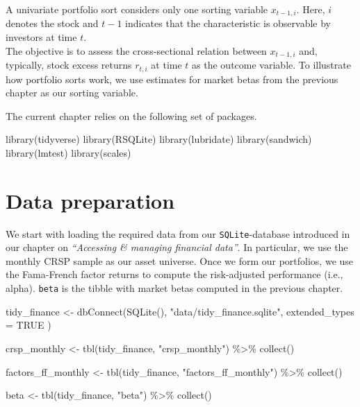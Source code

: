 \documentclass[
]{krantz}
\newenvironment{Shaded}{\begin{snugshade}}{\end{snugshade}}
\newcommand{\AttributeTok}[1]{\textcolor[rgb]{0.61,0.61,0.61}{#1}}
\newcommand{\ConstantTok}[1]{\textcolor[rgb]{0,0,0}{#1}}
\newcommand{\FunctionTok}[1]{\textcolor[rgb]{0,0,0}{#1}}
\newcommand{\NormalTok}[1]{#1}
\newcommand{\OtherTok}[1]{\textcolor[rgb]{0.37,0.37,0.37}{#1}}
\newcommand{\SpecialCharTok}[1]{\textcolor[rgb]{0,0,0}{#1}}
\newcommand{\StringTok}[1]{\textcolor[rgb]{0.5,0.5,0.5}{#1}}
\begin{document}
A univariate portfolio sort considers only one sorting variable \(x_{t-1,i}\).
Here, \(i\) denotes the stock and \(t-1\) indicates that the characteristic is observable by investors at time \(t\).\\
The objective is to assess the cross-sectional relation between \(x_{t-1,i}\) and, typically, stock excess returns \(r_{t,i}\) at time \(t\) as the outcome variable.
To illustrate how portfolio sorts work, we use estimates for market betas from the previous chapter as our sorting variable.

The current chapter relies on the following set of packages.

\begin{Shaded}
\begin{Highlighting}[]
\FunctionTok{library}\NormalTok{(tidyverse)}
\FunctionTok{library}\NormalTok{(RSQLite)}
\FunctionTok{library}\NormalTok{(lubridate)}
\FunctionTok{library}\NormalTok{(sandwich)}
\FunctionTok{library}\NormalTok{(lmtest)}
\FunctionTok{library}\NormalTok{(scales)}
\end{Highlighting}
\end{Shaded}

\hypertarget{data-preparation}{%
\section{Data preparation}\label{data-preparation}}

We start with loading the required data from our \texttt{SQLite}-database introduced in our chapter on \emph{``Accessing \& managing financial data''}. In particular, we use the monthly CRSP sample as our asset universe.
Once we form our portfolios, we use the Fama-French factor returns to compute the risk-adjusted performance (i.e., alpha).
\texttt{beta} is the tibble with market betas computed in the previous chapter.

\begin{Shaded}
\begin{Highlighting}[]
\NormalTok{tidy\_finance }\OtherTok{\textless{}{-}} \FunctionTok{dbConnect}\NormalTok{(}\FunctionTok{SQLite}\NormalTok{(), }\StringTok{"data/tidy\_finance.sqlite"}\NormalTok{,}
  \AttributeTok{extended\_types =} \ConstantTok{TRUE}
\NormalTok{)}

\NormalTok{crsp\_monthly }\OtherTok{\textless{}{-}} \FunctionTok{tbl}\NormalTok{(tidy\_finance, }\StringTok{"crsp\_monthly"}\NormalTok{) }\SpecialCharTok{\%\textgreater{}\%}
  \FunctionTok{collect}\NormalTok{()}

\NormalTok{factors\_ff\_monthly }\OtherTok{\textless{}{-}} \FunctionTok{tbl}\NormalTok{(tidy\_finance, }\StringTok{"factors\_ff\_monthly"}\NormalTok{) }\SpecialCharTok{\%\textgreater{}\%}
  \FunctionTok{collect}\NormalTok{()}

\NormalTok{beta }\OtherTok{\textless{}{-}} \FunctionTok{tbl}\NormalTok{(tidy\_finance, }\StringTok{"beta"}\NormalTok{) }\SpecialCharTok{\%\textgreater{}\%}
  \FunctionTok{collect}\NormalTok{()}
\end{Highlighting}
\end{Shaded}
\end{document}
